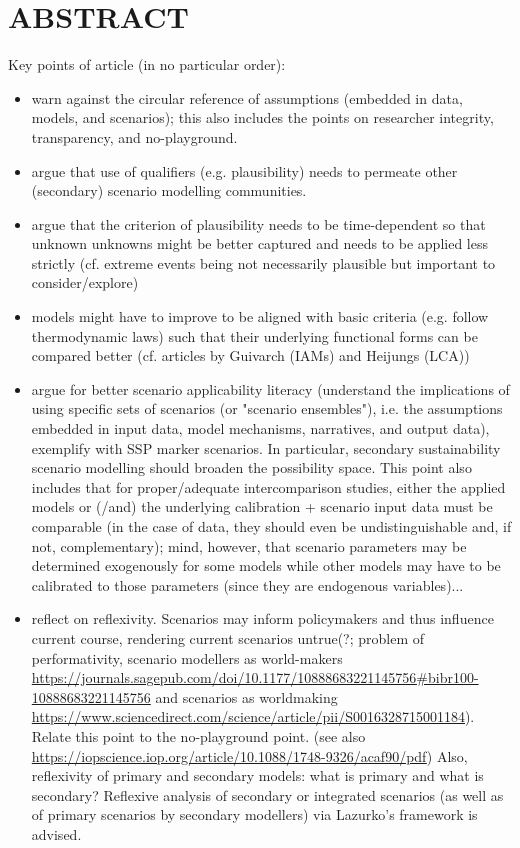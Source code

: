 \documentclass{article}
\begin{document}

\frontmatter
\tableofcontents

\mainmatter
\linenumbers

{\huge{\multiTitle}}

\section*{ABSTRACT}
Key points of article (in no particular order):

\begin{itemize}
    \item warn against the circular reference of assumptions (embedded in data, models, and scenarios); this also includes the points on researcher integrity, transparency, and no-playground.
    \item argue that use of qualifiers (e.g. plausibility) needs to permeate other (secondary) scenario modelling communities.
    \item argue that the criterion of plausibility needs to be time-dependent so that unknown unknowns might be better captured and needs to be applied less strictly (cf. extreme events being not necessarily plausible but important to consider/explore)
    \item models might have to improve to be aligned with basic criteria (e.g. follow thermodynamic laws) such that their underlying functional forms can be compared better (cf. articles by Guivarch (IAMs) and Heijungs (LCA))
    \item argue for better scenario applicability literacy (understand the implications of using specific sets of scenarios (or "scenario ensembles"), i.e. the assumptions embedded in input data, model mechanisms, narratives, and output data), exemplify with SSP marker scenarios. In particular, secondary sustainability scenario modelling should broaden the possibility space. This point also includes that for proper/adequate intercomparison studies, either the applied models or (/and) the underlying calibration + scenario input data must be comparable (in the case of data, they should even be undistinguishable and, if not, complementary); mind, however, that scenario parameters may be determined exogenously for some models while other models may have to be calibrated to those parameters (since they are endogenous variables)...
    \item reflect on reflexivity. Scenarios may inform policymakers and thus influence current course, rendering current scenarios untrue(?; problem of performativity, scenario modellers as world-makers \url{https://journals.sagepub.com/doi/10.1177/10888683221145756#bibr100-10888683221145756} and scenarios as worldmaking \url{https://www.sciencedirect.com/science/article/pii/S0016328715001184}). Relate this point to the no-playground point. (see also \url{https://iopscience.iop.org/article/10.1088/1748-9326/acaf90/pdf}) Also, reflexivity of primary and secondary models: what is primary and what is secondary? Reflexive analysis of secondary or integrated scenarios (as well as of primary scenarios by secondary modellers) via Lazurko's framework is advised.
\end{itemize}
\end{document}

